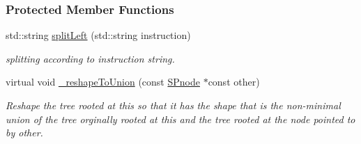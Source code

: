 \subsubsection*{\-Protected \-Member \-Functions}
\begin{DoxyCompactItemize}
\item 
std\-::string \hyperlink{classsubpavings_1_1SPnode_a44aaa22ba1f62c17775a96071c05ad8b}{split\-Left} (std\-::string instruction)
\begin{DoxyCompactList}\small\item\em splitting according to instruction string. \end{DoxyCompactList}\item 
virtual void \hyperlink{classsubpavings_1_1SPnode_a7ac37cce7f65b0f4c71d37b06d581d17}{\-\_\-reshape\-To\-Union} (const \hyperlink{classsubpavings_1_1SPnode}{\-S\-Pnode} $\ast$const other)
\begin{DoxyCompactList}\small\item\em \-Reshape the tree rooted at this so that it has the shape that is the non-\/minimal union of the tree orginally rooted at this and the tree rooted at the node pointed to by {\itshape other\/}. \end{DoxyCompactList}\end{DoxyCompactItemize}
